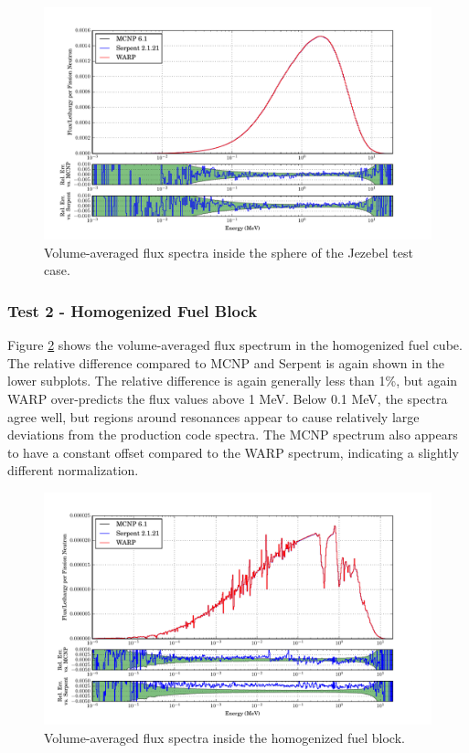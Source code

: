 \documentclass[preprint,12pt]{elsarticle}
\begin{document}
\begin{figure}[h!]
\centering
\includegraphics[width=\textwidth,trim= 1cm 0cm 1cm 0cm]{graphics/jezebel_spec.pdf}
\caption{Volume-averaged flux spectra inside the sphere of the Jezebel test case. \label{jezebel_spec} }
\end{figure}

\newpage
\subsubsection{Test 2 - Homogenized Fuel Block}

Figure \ref{homfuel_spec} shows the volume-averaged flux spectrum in the homogenized fuel cube.  The relative difference compared to MCNP and Serpent is again shown in the lower subplots.  The relative difference is again generally less than 1\%, but again WARP over-predicts the flux values above 1 MeV.  Below 0.1 MeV, the spectra agree well, but regions around resonances appear to cause relatively large deviations from the production code spectra.  The MCNP spectrum also appears to have a constant offset compared to the WARP spectrum, indicating a slightly different normalization. 

\begin{figure}[h!]
\centering
\includegraphics[width=\textwidth,trim= 1cm 0cm 1cm 0cm]{graphics/homfuel_spec.pdf}
\caption{Volume-averaged flux spectra inside the homogenized fuel block. \label{homfuel_spec} }
\end{figure}
\end{document}
